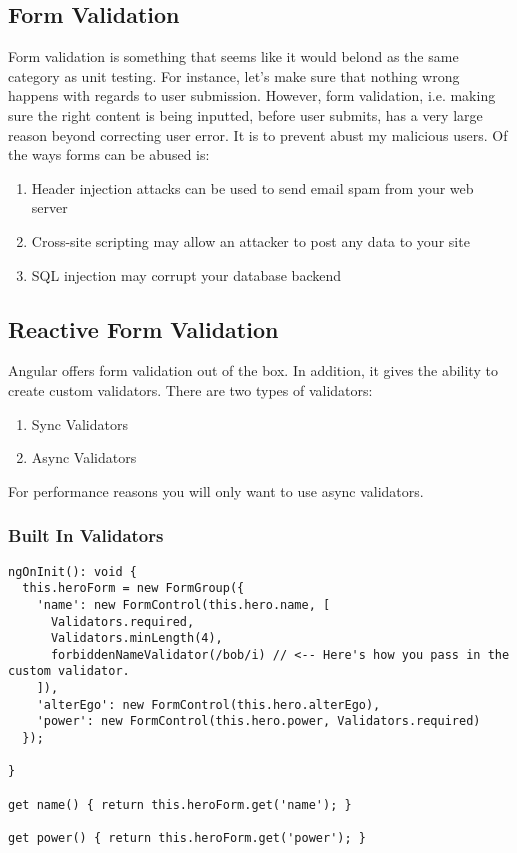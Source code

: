 \subsection{Form Validation}
Form validation is something that seems like it would belond as the same 
category as unit testing. For instance, let's make sure that nothing wrong 
happens with regards to user submission. However, form validation, i.e. 
making sure the right content is being inputted, before user submits, has a 
very large reason beyond correcting user error. It is to prevent abust my 
malicious users. Of the ways forms can be abused is: 
\begin{enumerate}
  \item Header injection attacks can be used to send email spam from your web 
  server
  \item Cross-site scripting may allow an attacker to post any data to your 
  site
  \item SQL injection may corrupt your database backend
\end{enumerate}

\subsection{ Reactive Form Validation }
Angular offers form validation out of the box. In addition, it gives the
ability to create custom validators. There are two types of validators: 
\begin{enumerate}
  \item Sync Validators
  \item Async Validators
\end{enumerate}

For performance reasons you will only want to use async validators. 

\subsubsection{Built In Validators}

\begin{lstlisting}
ngOnInit(): void {
  this.heroForm = new FormGroup({
    'name': new FormControl(this.hero.name, [
      Validators.required,
      Validators.minLength(4),
      forbiddenNameValidator(/bob/i) // <-- Here's how you pass in the custom validator.
    ]),
    'alterEgo': new FormControl(this.hero.alterEgo),
    'power': new FormControl(this.hero.power, Validators.required)
  });

}

get name() { return this.heroForm.get('name'); }

get power() { return this.heroForm.get('power'); }
\end{lstlisting}

